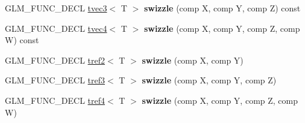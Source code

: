 \begin{DoxyCompactItemize}
\item 
\hypertarget{structglm_1_1detail_1_1tvec4_ad3e7a2acd80f64d62fedef583cd607dd}{\-G\-L\-M\-\_\-\-F\-U\-N\-C\-\_\-\-D\-E\-C\-L \hyperlink{structglm_1_1detail_1_1tvec3}{tvec3}$<$ \-T $>$ {\bfseries swizzle} (comp \-X, comp \-Y, comp \-Z) const }\label{structglm_1_1detail_1_1tvec4_ad3e7a2acd80f64d62fedef583cd607dd}

\item 
\hypertarget{structglm_1_1detail_1_1tvec4_a789482aae1e29ca3f5b8fa4deeb0b319}{\-G\-L\-M\-\_\-\-F\-U\-N\-C\-\_\-\-D\-E\-C\-L \hyperlink{structglm_1_1detail_1_1tvec4}{tvec4}$<$ \-T $>$ {\bfseries swizzle} (comp \-X, comp \-Y, comp \-Z, comp \-W) const }\label{structglm_1_1detail_1_1tvec4_a789482aae1e29ca3f5b8fa4deeb0b319}

\item 
\hypertarget{structglm_1_1detail_1_1tvec4_a26ffc9549f4c33f12d74e55da0444f55}{\-G\-L\-M\-\_\-\-F\-U\-N\-C\-\_\-\-D\-E\-C\-L \hyperlink{structglm_1_1detail_1_1tref2}{tref2}$<$ \-T $>$ {\bfseries swizzle} (comp \-X, comp \-Y)}\label{structglm_1_1detail_1_1tvec4_a26ffc9549f4c33f12d74e55da0444f55}

\item 
\hypertarget{structglm_1_1detail_1_1tvec4_a8e714a52b5fd756328b0fc1c6a3b2b62}{\-G\-L\-M\-\_\-\-F\-U\-N\-C\-\_\-\-D\-E\-C\-L \hyperlink{structglm_1_1detail_1_1tref3}{tref3}$<$ \-T $>$ {\bfseries swizzle} (comp \-X, comp \-Y, comp \-Z)}\label{structglm_1_1detail_1_1tvec4_a8e714a52b5fd756328b0fc1c6a3b2b62}

\item 
\hypertarget{structglm_1_1detail_1_1tvec4_aa9301374ce40ac20d6274ba4591e7f4a}{\-G\-L\-M\-\_\-\-F\-U\-N\-C\-\_\-\-D\-E\-C\-L \hyperlink{structglm_1_1detail_1_1tref4}{tref4}$<$ \-T $>$ {\bfseries swizzle} (comp \-X, comp \-Y, comp \-Z, comp \-W)}\label{structglm_1_1detail_1_1tvec4_aa9301374ce40ac20d6274ba4591e7f4a}

\end{DoxyCompactItemize}
